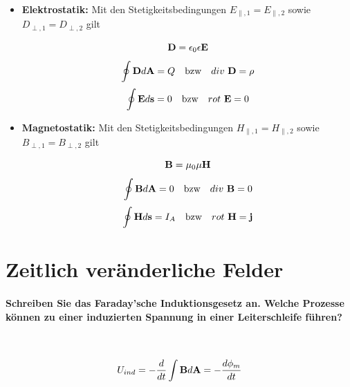 \documentclass[a4paper, 11pt, ngerman, parskip=half-]{scrartcl}
\begin{document}
\begin{itemize}
    \item \textbf{Elektrostatik:} Mit den Stetigkeitsbedingungen $E_{\parallel,1} = E_{\parallel,2}$
          sowie $D_{\perp,1} = D_{\perp,2}$ gilt

          \begin{equation}
              \bold{D} = \epsilon_0 \epsilon \bold{E}
          \end{equation}
          \begin{equation}
              \oint \bold{D} d\bold{A} = Q ~~~ \text{bzw} ~~~ div~\bold{D} = \rho
          \end{equation}
          \begin{equation}
              \oint \bold{E} d\bold{s} = 0 ~~~ \text{bzw} ~~~ rot~\bold{E} = 0
          \end{equation}

    \item \textbf{Magnetostatik:} Mit den Stetigkeitsbedingungen $H_{\parallel,1} = H_{\parallel,2}$
          sowie $B_{\perp,1} = B_{\perp,2}$ gilt

          \begin{equation}
              \bold{B} = \mu_0 \mu \bold{H}
          \end{equation}
          \begin{equation}
              \oint \bold{B} d\bold{A} = 0 ~~~ \text{bzw} ~~~ div~\bold{B} = 0
          \end{equation}
          \begin{equation}
              \oint \bold{H} d\bold{s} = I_A ~~~ \text{bzw} ~~~ rot~\bold{H} = \bold{j}
          \end{equation}
\end{itemize}

\newpage

\section{Zeitlich veränderliche Felder}

\paragraph{Schreiben Sie das Faraday'sche Induktionsgesetz an. Welche Prozesse können zu einer
    induzierten Spannung in einer Leiterschleife führen?} ~

\begin{equation}
    U_{ind} = - \frac{d}{dt} \int \bold{B} d\bold{A} = - \frac{d \phi_m}{dt}
\end{equation}
\end{document}
